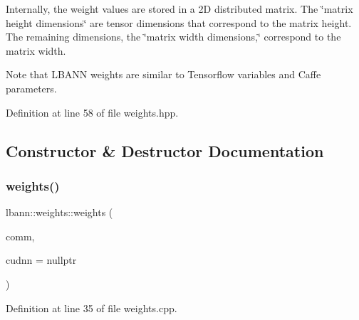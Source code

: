 Internally, the weight values are stored in a 2D distributed matrix. The \char`\"{}matrix height dimensions\char`\"{} are tensor dimensions that correspond to the matrix height. The remaining dimensions, the \char`\"{}matrix width dimensions,\char`\"{} correspond to the matrix width.

Note that L\+B\+A\+NN weights are similar to Tensorflow variables and Caffe parameters. 

Definition at line 58 of file weights.\+hpp.



\subsection{Constructor \& Destructor Documentation}
\mbox{\label{classlbann_1_1weights_a21a3a3f1806197d10619a1450871e066}} 
\subsubsection{\texorpdfstring{weights()}{weights()}\hspace{0.1cm}{\footnotesize\ttfamily [1/2]}}
{\footnotesize\ttfamily lbann\+::weights\+::weights (\begin{DoxyParamCaption}\item[{\hyperlink{classlbann_1_1lbann__comm}{lbann\+\_\+comm} $\ast$}]{comm,  }\item[{\hyperlink{classlbann_1_1cudnn_1_1cudnn__manager}{cudnn\+::cudnn\+\_\+manager} $\ast$}]{cudnn = {\ttfamily nullptr} }\end{DoxyParamCaption})}



Definition at line 35 of file weights.\+cpp.



